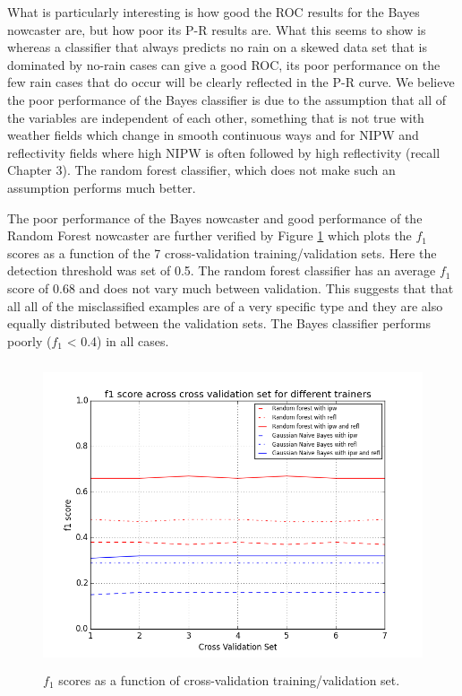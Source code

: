 \documentclass[proposal]{umassthesis}
\begin{document}
{What is particularly interesting is how good the ROC results for the Bayes nowcaster are, but how poor its P-R results are. What this seems to show is whereas a classifier that always predicts no rain on a skewed data set that is dominated by no-rain cases can give a good ROC, its poor performance on the few rain cases that do occur will be clearly reflected in the P-R curve. We believe the poor performance of the Bayes classifier is due to the assumption that all of the variables are independent of each other, something that is not true with weather fields which change in smooth continuous ways and for NIPW and reflectivity fields where high NIPW is often followed by high reflectivity (recall Chapter 3). The random forest classifier, which does not make such an assumption performs much better.

The poor performance of the Bayes nowcaster and good performance of the Random Forest nowcaster are further verified by Figure \ref{fig:f1_scores} which plots the $f_1$ scores as a function of the 7 cross-validation training/validation sets. Here the detection threshold was set of 0.5. The random forest classifier has an average $f_1$ score of 0.68 and does not vary much between validation. This suggests that that all all of the misclassified examples are of a very specific type and they are also equally distributed between the validation sets. The Bayes classifier performs poorly ($f_1$ < 0.4) in all cases.

\begin{figure}[!t]
\begin{center}
\includegraphics[width = 15cm,height = 9cm]{f1_scores}
\caption{$f_1$ scores as a function of cross-validation training/validation set.}
\label{fig:f1_scores}
\end{center}
\end{figure}

}
\end{document}
